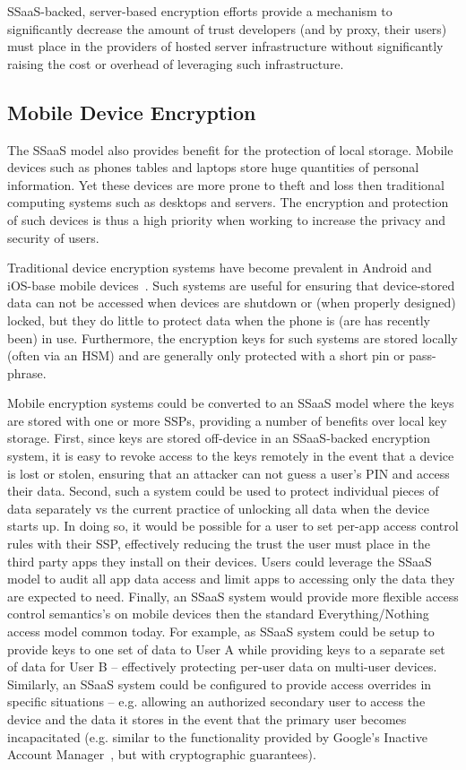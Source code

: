 SSaaS-backed, server-based encryption efforts provide a mechanism to
significantly decrease the amount of trust developers (and by proxy,
their users) must place in the providers of hosted server
infrastructure without significantly raising the cost or overhead of
leveraging such infrastructure.

\subsection{Mobile Device Encryption}

The SSaaS model also provides benefit for the protection of local
storage. Mobile devices such as phones tables and laptops
store huge quantities of personal information. Yet these devices are
more prone to theft and loss then traditional computing systems such
as desktops and servers. The encryption and protection of such devices
is thus a high priority when working to increase the privacy and
security of users.

Traditional device encryption systems have become prevalent in Android
and iOS-base mobile devices~\cite{ars-android-encrypt,
  ars-ios-encrypt}. Such systems are useful for ensuring that
device-stored data can not be accessed when devices are shutdown or
(when properly designed) locked, but they do little to protect data
when the phone is (are has recently been) in use. Furthermore, the
encryption keys for such systems are stored locally (often via an HSM)
and are generally only protected with a short pin or pass-phrase.

Mobile encryption systems could be converted to an SSaaS model where
the keys are stored with one or more SSPs, providing a number of
benefits over local key storage. First, since keys are stored
off-device in an SSaaS-backed encryption system, it is easy to revoke
access to the keys remotely in the event that a device is lost or
stolen, ensuring that an attacker can not guess a user's PIN and
access their data. Second, such a system could be used to protect
individual pieces of data separately vs the current practice of
unlocking all data when the device starts up. In doing so, it would be
possible for a user to set per-app access control rules with their
SSP, effectively reducing the trust the user must place in the third
party apps they install on their devices. Users could leverage the
SSaaS model to audit all app data access and limit apps to accessing
only the data they are expected to need. Finally, an SSaaS system
would provide more flexible access control semantics's on mobile
devices then the standard Everything/Nothing access model common
today. For example, as SSaaS system could be setup to provide keys to
one set of data to User A while providing keys to a separate set of
data for User B -- effectively protecting per-user data on multi-user
devices. Similarly, an SSaaS system could be configured to provide
access overrides in specific situations -- e.g. allowing an authorized
secondary user to access the device and the data it stores in the
event that the primary user becomes incapacitated (e.g. similar to the
functionality provided by Google's Inactive Account
Manager~\cite{atlantic-google-iam}, but with cryptographic
guarantees).

